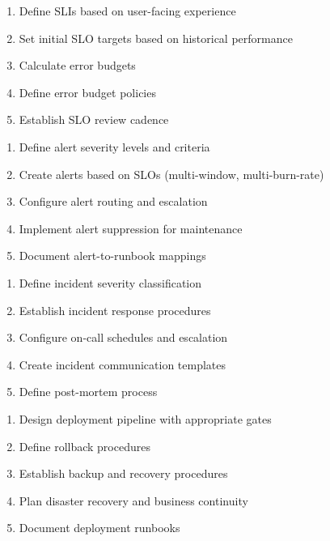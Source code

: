 \documentclass[11pt,letterpaper]{article}
\begin{document}
\begin{guidancebox}
\begin{enumerate}[nosep]
    \item Define SLIs based on user-facing experience
    \item Set initial SLO targets based on historical performance
    \item Calculate error budgets
    \item Define error budget policies
    \item Establish SLO review cadence
\end{enumerate}
\end{guidancebox}

\begin{guidancebox}
\begin{enumerate}[nosep]
    \item Define alert severity levels and criteria
    \item Create alerts based on SLOs (multi-window, multi-burn-rate)
    \item Configure alert routing and escalation
    \item Implement alert suppression for maintenance
    \item Document alert-to-runbook mappings
\end{enumerate}
\end{guidancebox}

\begin{guidancebox}
\begin{enumerate}[nosep]
    \item Define incident severity classification
    \item Establish incident response procedures
    \item Configure on-call schedules and escalation
    \item Create incident communication templates
    \item Define post-mortem process
\end{enumerate}
\end{guidancebox}

\begin{guidancebox}
\begin{enumerate}[nosep]
    \item Design deployment pipeline with appropriate gates
    \item Define rollback procedures
    \item Establish backup and recovery procedures
    \item Plan disaster recovery and business continuity
    \item Document deployment runbooks
\end{enumerate}
\end{guidancebox}
\end{document}
